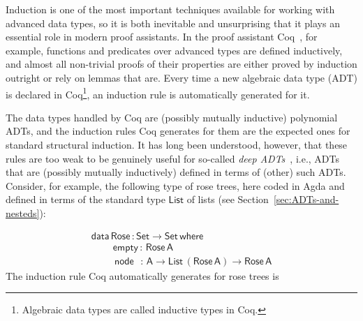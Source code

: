 \documentclass[9pt]{entcs}
\begin{document}
Induction is one of the most important techniques available for
working with advanced data types, so it is both inevitable and
unsurprising that it plays an essential role in modern proof
assistants. In the proof assistant Coq~\cite{coq20}, for example,
functions and predicates over advanced types are defined inductively,
and almost all non-trivial proofs of their properties are either
proved by induction outright or rely on lemmas that are.  {\color{red}
  Every time a new algebraic data type (ADT) is declared in
  Coq}\footnote{{\color{red} Algebraic data types are called inductive
    types in Coq.}}, an induction rule is automatically generated for
it.

The data types handled by Coq are (possibly mutually inductive)
polynomial ADTs, and the induction rules
Coq generates for them are the expected ones for standard structural
induction. It has long been understood, however, that these rules are
too weak to be genuinely useful for so-called {\em deep
  ADTs}~\cite{jp20}, i.e., ADTs that are (possibly mutually
inductively) defined in terms of (other) such ADTs.
Consider, for example, the following type of rose trees, here coded in
{\color{red} Agda} and defined in terms of the standard type
$\mathsf{List}$ of lists (see Section~\ref{sec:ADTs-and-nesteds}):

\vspace*{-0.075in}

\[\begin{array}{l}
\mathsf{data\, Rose\, : Set \to Set\,where}\\
\mathsf{\;\;\;\;\;\;\;\;empty\, :\, Rose\,A}\\
\mathsf{\;\;\;\;\;\;\;\;\,node\,\,\,\, :\, A \to List\,(Rose\,A) \to Rose\,A} 
\end{array}\]
\noindent
The induction rule Coq automatically generates for rose trees is

\vspace*{-0.075in}
\end{document}

